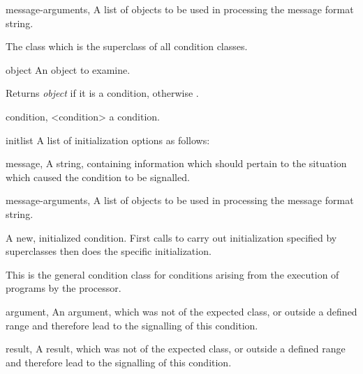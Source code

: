 \begin{optDefinition}
\begin{initoptions}
    \item[message-arguments, \classref{list}] A list of objects to be used in
    processing the message format string.
\end{initoptions}
%
\remarks%
The class which is the superclass of all condition classes.

%
\begin{arguments}
    \item[object] An object to examine.
\end{arguments}
%
\result%
Returns {\em object\/} if it is a condition, otherwise \nil.

%
\begin{specargs}
    \item[condition, <condition>] a condition.
    \item[initlist] A list of initialization options as follows:
    \begin{options}
        \item[message, \classref{string}] A string, containing information which
        should pertain to the situation which caused the condition to be
        signalled.

        \item[message-arguments, \classref{list}] A list of objects to be used
        in processing the message format string.
    \end{options}
\end{specargs}
%
\result%
A new, initialized condition.
%
\remarks%
First calls  to carry out initialization specified
by superclasses then does the  specific initialization.
%

%
This is the general condition class for conditions arising from the
execution of programs by the processor.

%
\begin{initoptions}
    \item[argument, \classref{object}] An argument, which was not of the
    expected class, or outside a defined range and therefore lead to the
    signalling of this condition.
\end{initoptions}

%
\begin{initoptions}
    \item[result, \classref{object}] A result, which was not of the expected
    class, or outside a defined range and therefore lead to the signalling of
    this condition.
\end{initoptions}


\end{optDefinition}
